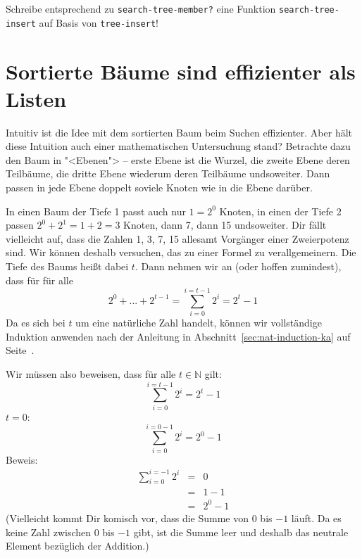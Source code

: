 \begin{aufgabeinline}
  Schreibe entsprechend zu \lstinline{search-tree-member?} eine
  Funktion \lstinline{search-tree-insert} auf Basis von
  \lstinline{tree-insert}!
\end{aufgabeinline}


\section{Sortierte Bäume sind effizienter als Listen}
  
Intuitiv ist die Idee mit dem sortierten Baum beim Suchen
effizienter.  Aber hält diese Intuition auch einer mathematischen
Untersuchung stand?  Betrachte dazu den Baum in "<Ebenen"> --
erste Ebene ist die Wurzel, die zweite Ebene deren Teilbäume, die
dritte Ebene wiederum deren Teilbäume undsoweiter.  Dann passen in
jede Ebene doppelt soviele Knoten wie in die Ebene darüber.

In einen Baum der Tiefe 1 passt auch nur $1 = 2^0$ Knoten, in einen
der Tiefe 2 passen $2^0 + 2^1 = 1+2 = 3$ Knoten, dann 7, dann 15
undsoweiter.  Dir fällt vielleicht auf, dass die Zahlen 1, 3, 7, 15
allesamt Vorgänger einer Zweierpotenz sind.  Wir können deshalb
versuchen, das zu einer Formel zu verallgemeinern.  Die Tiefe des
Baums heißt dabei $t$.  Dann nehmen wir an (oder hoffen zumindest),
dass für für alle 
%
\begin{displaymath}
  2^0 + ... + 2^{t-1} = \sum_{i=0}^{i=t-1} 2^i  = 2^t-1
\end{displaymath}
%
Da es sich bei $t$ um eine natürliche Zahl handelt, können wir
vollständige Induktion anwenden nach der Anleitung in
Abschnitt~\ref{sec:nat-induction-ka} auf
Seite~\pageref{sec:nat-induction-ka}.

Wir müssen also beweisen, dass für alle $t\in\mathbb{N}$ gilt:
%
\begin{displaymath}
  \sum_{i=0}^{i=t-1} 2^i  = 2^t-1
\end{displaymath}
%
$t=0$:
%
\begin{displaymath}
  \sum_{i=0}^{i=0-1} 2^i = 2^0 - 1
\end{displaymath}
%
Beweis:
%
\begin{eqnarray*}
  \sum_{i=0}^{i=-1} 2^i
  &=& 0\\
  &=& 1-1\\
  &=& 2^0 - 1
\end{eqnarray*}
%
(Vielleicht kommt Dir komisch vor, dass die Summe von $0$ bis $-1$
läuft.  Da es keine Zahl zwischen $0$ bis $-1$ gibt, ist die Summe
leer und deshalb das neutrale Element bezüglich der Addition.)

